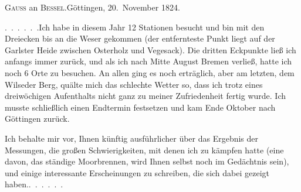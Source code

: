 \begin{center}
\textsc{Gauss} an \textsc{Bessel}.\quad Göttingen, 20.~November 1824.
\end{center}

\par\noindent\hspace*{\parindent}.\ .\ .\ .\ .\ .\quad Ich habe in diesem Jahr 12 Stationen besucht und bin mit den Dreiecken bis an die Weser gekommen (der entfernteste Punkt liegt auf der Garlster Heide zwischen Osterholz und Vegesack).
Die dritten Eckpunkte ließ ich anfangs immer zurück, und als ich nach Mitte August Bremen verließ, hatte ich noch 6 Orte zu besuchen.
An allen ging es noch erträglich, aber am letzten, dem Wilseder Berg, quälte mich das schlechte Wetter so, dass ich trotz eines dreiwöchigen Aufenthalts nicht ganz zu meiner Zufriedenheit fertig wurde. Ich musste schließlich einen Endtermin festsetzen und kam Ende Oktober nach Göttingen zurück.

\par\noindent\hspace*{\parindent}Ich behalte mir vor, Ihnen künftig ausführlicher über das Ergebnis der Messungen, die großen Schwierigkeiten, mit denen ich zu kämpfen hatte (eine davon, das ständige Moorbrennen, wird Ihnen selbst noch im Gedächtnis sein), und einige interessante Erscheinungen zu schreiben, die sich dabei gezeigt haben.\quad.\ .\ .\ .\ .\ .

